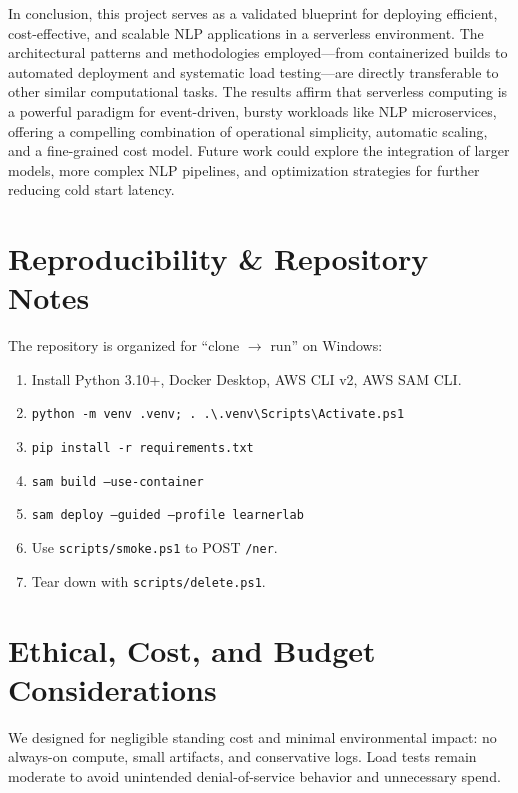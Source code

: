 \documentclass[11pt,a4paper]{article}
\begin{document}
In conclusion, this project serves as a validated blueprint for deploying efficient, cost-effective, and scalable NLP applications in a serverless environment. The architectural patterns and methodologies employed—from containerized builds to automated deployment and systematic load testing—are directly transferable to other similar computational tasks. The results affirm that serverless computing is a powerful paradigm for event-driven, bursty workloads like NLP microservices, offering a compelling combination of operational simplicity, automatic scaling, and a fine-grained cost model. Future work could explore the integration of larger models, more complex NLP pipelines, and optimization strategies for further reducing cold start latency.


\section*{Reproducibility \& Repository Notes}
The repository is organized for ``clone $\rightarrow$ run'' on Windows:
\begin{enumerate}[leftmargin=1.3em]
  \item Install Python 3.10+, Docker Desktop, AWS CLI v2, AWS SAM CLI.
  \item \texttt{python -m venv .venv; . .\textbackslash .venv\textbackslash Scripts\textbackslash Activate.ps1}
  \item \texttt{pip install -r requirements.txt}
  \item \texttt{sam build --use-container}
  \item \texttt{sam deploy --guided --profile learnerlab}
  \item Use \texttt{scripts/smoke.ps1} to POST \texttt{/ner}.
  \item Tear down with \texttt{scripts/delete.ps1}.
\end{enumerate}

\section*{Ethical, Cost, and Budget Considerations}
We designed for negligible standing cost and minimal environmental impact: no always-on compute, small artifacts, and conservative logs. Load tests remain moderate to avoid unintended denial-of-service behavior and unnecessary spend.
\end{document}
